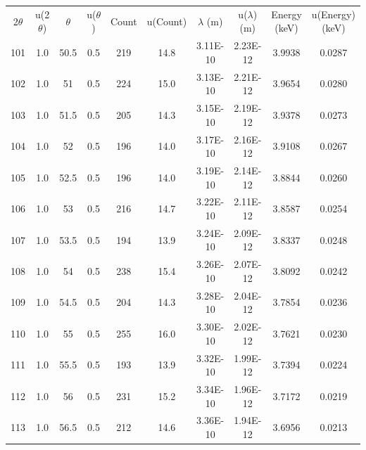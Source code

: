 \documentclass[justified]{tufte-book}
\begin{document}
\begin{table}[ht]
\center
\begin{tabular}{cccccccccc}
\multicolumn{1}{c}{2$\theta$} & \multicolumn{1}{c}{u(2$\theta$)} & \multicolumn{1}{c}{$\theta$} & \multicolumn{1}{c}{u($\theta$)} & \multicolumn{1}{c}{Count} & \multicolumn{1}{c}{u(Count)} & \multicolumn{1}{c}{$\lambda$ (m)} & \multicolumn{1}{c}{u($\lambda$) (m)} & \multicolumn{1}{c}{Energy (keV)} & \multicolumn{1}{c}{u(Energy) (keV)} \\
101         & 1.0   & 50.5       & 0.5           & 219     & 14.8       & 3.11E-10    & 2.23E-12       & 3.9938    & 0.0287       \\
102         & 1.0   & 51         & 0.5           & 224     & 15.0       & 3.13E-10    & 2.21E-12       & 3.9654    & 0.0280       \\
103         & 1.0   & 51.5       & 0.5           & 205     & 14.3       & 3.15E-10    & 2.19E-12       & 3.9378    & 0.0273       \\
104         & 1.0   & 52         & 0.5           & 196     & 14.0       & 3.17E-10    & 2.16E-12       & 3.9108    & 0.0267       \\
105         & 1.0   & 52.5       & 0.5           & 196     & 14.0       & 3.19E-10    & 2.14E-12       & 3.8844    & 0.0260       \\
106         & 1.0   & 53         & 0.5           & 216     & 14.7       & 3.22E-10    & 2.11E-12       & 3.8587    & 0.0254       \\
107         & 1.0   & 53.5       & 0.5           & 194     & 13.9       & 3.24E-10    & 2.09E-12       & 3.8337    & 0.0248       \\
108         & 1.0   & 54         & 0.5           & 238     & 15.4       & 3.26E-10    & 2.07E-12       & 3.8092    & 0.0242       \\
109         & 1.0   & 54.5       & 0.5           & 204     & 14.3       & 3.28E-10    & 2.04E-12       & 3.7854    & 0.0236       \\
110         & 1.0   & 55         & 0.5           & 255     & 16.0       & 3.30E-10    & 2.02E-12       & 3.7621    & 0.0230       \\
111         & 1.0   & 55.5       & 0.5           & 193     & 13.9       & 3.32E-10    & 1.99E-12       & 3.7394    & 0.0224       \\
112         & 1.0   & 56         & 0.5           & 231     & 15.2       & 3.34E-10    & 1.96E-12       & 3.7172    & 0.0219       \\
113         & 1.0   & 56.5       & 0.5           & 212     & 14.6       & 3.36E-10    & 1.94E-12       & 3.6956    & 0.0213       \\

\end{tabular}
\end{table}
\end{document}
